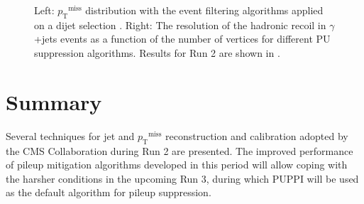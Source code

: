 \documentclass[a4paper,11pt]{article}
\newcommand{\MET}{\ensuremath{\ptmiss}\xspace}
\newcommand{\pt}{\ensuremath{p_{\text{T}}}\xspace}
\newcommand{\ptmiss}{\ensuremath{\pt^\text{miss}}\xspace}
\begin{document}
\begin{figure}[htb]
\centering
{}
\caption{ Left: \ptmiss distribution with the event filtering algorithms applied on a dijet selection \citep{MET}. Right: The resolution of the hadronic recoil in $\gamma$+jets events as a function of the number of vertices for different PU suppression algorithms. Results for Run 2 are shown in \citep{METNotes}.
}
\label{fig:PerfMET}
\end{figure}

\section{Summary}
Several techniques for jet and \MET reconstruction  and calibration adopted by the CMS Collaboration during Run 2 are presented.
The improved performance of pileup mitigation algorithms developed in this period will allow coping with the harsher conditions in the upcoming Run 3, during which PUPPI will be used as the default algorithm for pileup suppression.



\end{document}
